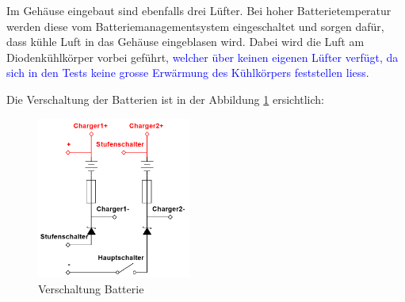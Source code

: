 Im Gehäuse eingebaut sind ebenfalls drei Lüfter. Bei hoher Batterietemperatur werden diese vom Batteriemanagementsystem eingeschaltet und sorgen dafür, dass kühle Luft in das Gehäuse eingeblasen wird. Dabei wird die Luft am Diodenkühlkörper vorbei geführt, \textcolor{blue}{welcher über keinen eigenen Lüfter verfügt, da sich in den Tests keine grosse Erwärmung des Kühlkörpers feststellen liess}.

Die Verschaltung der Batterien ist in der Abbildung \ref{fig:versch_bat} ersichtlich:

\begin{figure}[h!]
	\centering
		\includegraphics[width=0.45\textwidth]{images/BAT.PNG}
	\caption{Verschaltung Batterie}
	\label{fig:versch_bat}
\end{figure}